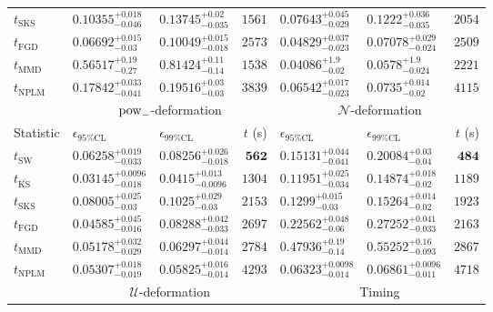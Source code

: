 \begin{tabular}{l|llr|llr}
	$t_{\mathrm{SKS}}$ & $0.10355_{-0.046}^{+0.018}$ & $0.13745_{-0.035}^{+0.02}$ & $1561$ & $0.07643_{-0.029}^{+0.045}$ & $0.1222_{-0.035}^{+0.036}$ & $2054$ \\
	$t_{\mathrm{FGD}}$ & ${\mathbf{0.06692_{-0.03}^{+0.015}}}$ & ${\mathbf{0.10049_{-0.018}^{+0.015}}}$ & $2573$ & $0.04829_{-0.023}^{+0.037}$ & $0.07078_{-0.024}^{+0.029}$ & $2509$ \\
	$t_{\mathrm{MMD}}$ & $0.56517_{-0.27}^{+0.19}$ & $0.81424_{-0.14}^{+0.11}$ & $1538$ & $0.04086_{-0.02}^{+1.9}$ & $0.0578_{-0.024}^{+1.9}$ & $2221$ \\
\rowcolor{red!35}	$t_{\mathrm{NPLM}}$ & $0.17842_{-0.041}^{+0.033}$ & $0.19516_{-0.03}^{+0.03}$ & $3839$ & $0.06542_{-0.023}^{+0.017}$ & $0.0735_{-0.02}^{+0.014}$ & $4115$ \\
	\toprule
	\multicolumn{1}{c}{} & \multicolumn{3}{c}{$\rm{pow}_{-}$-deformation} & \multicolumn{3}{c}{$\mathcal{N}$-deformation} \\
Statistic & $\epsilon_{95\%\mathrm{CL}}$ & $\epsilon_{99\%\mathrm{CL}}$ & $t$ (s) & $\epsilon_{95\%\mathrm{CL}}$ & $\epsilon_{99\%\mathrm{CL}}$ & $t$ (s) \\
	\midrule
	$t_{\mathrm{SW}}$ & $0.06258_{-0.033}^{+0.019}$ & $0.08256_{-0.018}^{+0.026}$ & ${\mathbf{562}}$ & $0.15131_{-0.041}^{+0.044}$ & $0.20084_{-0.04}^{+0.03}$ & ${\mathbf{484}}$ \\
	$t_{\overline{\mathrm{KS}}}$ & ${\mathbf{0.03145_{-0.018}^{+0.0096}}}$ & ${\mathbf{0.0415_{-0.0096}^{+0.013}}}$ & $1304$ & ${\mathbf{0.11951_{-0.034}^{+0.025}}}$ & ${\mathbf{0.14874_{-0.02}^{+0.018}}}$ & $1189$ \\
	$t_{\mathrm{SKS}}$ & $0.08005_{-0.03}^{+0.025}$ & $0.1025_{-0.03}^{+0.029}$ & $2153$ & $0.1299_{-0.03}^{+0.015}$ & $0.15264_{-0.02}^{+0.014}$ & $1923$ \\
	$t_{\mathrm{FGD}}$ & $0.04585_{-0.016}^{+0.045}$ & $0.08288_{-0.033}^{+0.042}$ & $2697$ & $0.22562_{-0.06}^{+0.048}$ & $0.27252_{-0.033}^{+0.041}$ & $2163$ \\
	$t_{\mathrm{MMD}}$ & $0.05178_{-0.029}^{+0.032}$ & $0.06297_{-0.014}^{+0.044}$ & $2784$ & $0.47936_{-0.14}^{+0.19}$ & $0.55252_{-0.093}^{+0.16}$ & $2867$ \\
\rowcolor{red!35}	$t_{\mathrm{NPLM}}$ & $0.05307_{-0.019}^{+0.018}$ & $0.05825_{-0.014}^{+0.016}$ & $4293$ & $0.06323_{-0.014}^{+0.0098}$ & $0.06861_{-0.011}^{+0.0096}$ & $4718$ \\
	\toprule
	\multicolumn{1}{c}{} & \multicolumn{3}{c}{$\mathcal{U}$-deformation} & \multicolumn{3}{c}{Timing} \\

\end{tabular}
